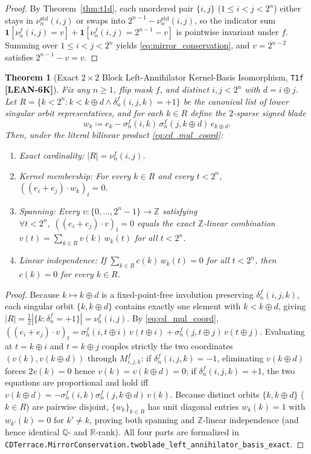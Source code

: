 \documentclass[11pt,reqno]{amsart}
\newcommand{\code}[1]{\textnormal{\texttt{\small\nolinkurl{#1}}}}
\theoremstyle{plain}
\newtheorem{theorem}{Theorem}[section]
\theoremstyle{definition}
\theoremstyle{remark}
\newcommand{\tagLean}{\mbox{\textsf{\textbf{\color{oiBlue}[LEAN-6K]}}}}
\newcommand{\R}{\mathbb{R}}
\newcommand{\Z}{\mathbb{Z}}
\newcommand{\Q}{\mathbb{Q}}
\newcommand{\std}{\mathrm{std}}
\begin{document}
\begin{proof}
By Theorem~\ref{thm:t1d}, each unordered pair $\{i, j\}$ ($1 \le i < j < 2^n$) either stays in
$\nu_n^{\std}(i, j)$ or swaps into $2^{n-1} - \nu_n^{\std}(i, j)$, so the indicator sum
$\mathbf{1}[\nu_n^{f}(i, j) = v] + \mathbf{1}[\nu_n^{f}(i, j) = 2^{n-1}-v]$ is pointwise
invariant under $f$. Summing over $1 \le i < j < 2^n$ yields \eqref{eq:mirror_conservation}, and
$v = 2^{n-2}$ satisfies $2^{n-1} - v = v$.
\end{proof}

\begin{theorem}[Exact $2\times 2$ Block Left-Annihilator Kernel-Basis Isomorphism, \texttt{T1f} \tagLean]
\label{thm:t1f}
Fix any $n \ge 1$, flip mask $f$, and distinct $i, j < 2^n$ with $d = i \oplus j$. Let
$R = \{k < 2^n : k < k \oplus d \land \delta_n^{f}(i, j, k) = +1\}$ be the canonical list of
lower singular orbit representatives, and for each $k \in R$ define the $2$-sparse signed blade
\[
  w_k \coloneqq e_k - \sigma_n^{f}(i, k)\,\sigma_n^{f}(j, k \oplus d)\, e_{k \oplus d}.
\]
Then, under the literal bilinear product \eqref{eq:cd_mul_coord}:
\begin{enumerate}[leftmargin=2em]
  \item \emph{Exact cardinality:} $|R| = \nu_n^{f}(i, j)$.
  \item \emph{Kernel membership:} For every $k \in R$ and every $t < 2^n$, $((e_i+e_j) \cdot w_k)_t = 0$.
  \item \emph{Spanning:} Every $v : \{0,\dots,2^n-1\} \to \Z$ satisfying
    $\forall t < 2^n,\; ((e_i+e_j) \cdot v)_t = 0$ equals the exact $\Z$-linear combination
    $v(t) = \sum_{k \in R} v(k)\, w_k(t)$ for all $t < 2^n$.
  \item \emph{Linear independence:} If $\sum_{k \in R} c(k)\, w_k(t) = 0$ for all $t < 2^n$,
    then $c(k) = 0$ for every $k \in R$.
\end{enumerate}
\end{theorem}

\begin{proof}
Because $k \mapsto k \oplus d$ is a fixed-point-free involution preserving $\delta_n^f(i,j,k)$,
each singular orbit $\{k, k \oplus d\}$ contains exactly one element with $k < k \oplus d$,
giving $|R| = \frac{1}{2}|\{k : \delta_n^f = +1\}| = \nu_n^f(i,j)$. By \eqref{eq:cd_mul_coord},
$((e_i + e_j) \cdot v)_t = \sigma_n^f(i, t \oplus i)\, v(t \oplus i) + \sigma_n^f(j, t \oplus j)\, v(t \oplus j)$.
Evaluating at $t = k \oplus i$ and $t = k \oplus j$ couples strictly the two coordinates
$(v(k), v(k \oplus d))$ through $M_{i,j,k}^f$: if $\delta_n^f(i,j,k) = -1$, eliminating $v(k\oplus d)$
forces $2 v(k) = 0$ hence $v(k) = v(k \oplus d) = 0$; if $\delta_n^f(i,j,k) = +1$, the two equations
are proportional and hold iff $v(k \oplus d) = -\sigma_n^f(i,k)\sigma_n^f(j, k \oplus d)\, v(k)$.
Because distinct orbits $\{k, k \oplus d\}$ ($k \in R$) are pairwise disjoint, $\{w_k\}_{k \in R}$
has unit diagonal entries $w_k(k) = 1$ with $w_{k'}(k) = 0$ for $k' \neq k$, proving both
spanning and $\Z$-linear independence (and hence identical $\Q$- and $\R$-rank). All four parts
are formalized in \code{CDTerrace.MirrorConservation.twoblade_left_annihilator_basis_exact}.
\end{proof}
\end{document}
